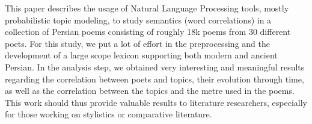 This paper describes the usage of Natural Language Processing tools,   mostly probabilistic topic modeling, to study semantics (word
   correlations) in a collection of Persian poems consisting of roughly
   18k poems from 30 different poets.  For this study, we put a lot of
   effort in the preprocessing and the development of a large scope
   lexicon supporting both modern and ancient Persian. In the analysis
   step, we obtained very interesting and meaningful results regarding
   the correlation between poets and topics, their evolution through
   time, as well as the correlation between the topics and the metre
   used in the poems. This work should thus provide valuable results to
   literature researchers, especially for those working on
   stylistics or comparative literature.

